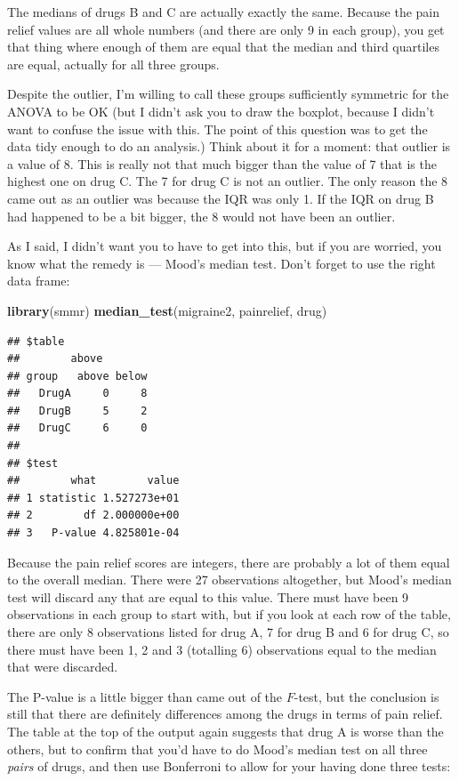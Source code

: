 \documentclass[]{tufte-book}
\newenvironment{Shaded}{}{}
\newcommand{\KeywordTok}[1]{\textcolor[rgb]{0.00,0.44,0.13}{\textbf{#1}}}
\newcommand{\NormalTok}[1]{#1}
\theoremstyle{definition}
\theoremstyle{definition}
\theoremstyle{definition}
\theoremstyle{remark}
\begin{document}
The medians of drugs B and C are actually exactly the same. Because the
pain relief values are all whole numbers (and there are only 9 in each
group), you get that thing where enough of them are equal that the
median and third quartiles are equal, actually for all three groups.

Despite the outlier, I'm willing to call these groups sufficiently
symmetric for the ANOVA to be OK (but I didn't ask you to draw the
boxplot, because I didn't want to confuse the issue with this. The point
of this question was to get the data tidy enough to do an analysis.)
Think about it for a moment: that outlier is a value of 8. This is
really not that much bigger than the value of 7 that is the highest one
on drug C. The 7 for drug C is not an outlier. The only reason the 8
came out as an outlier was because the IQR was only 1. If the IQR on
drug B had happened to be a bit bigger, the 8 would not have been an
outlier.

As I said, I didn't want you to have to get into this, but if you are
worried, you know what the remedy is --- Mood's median test. Don't
forget to use the right data frame:

\begin{Shaded}
\begin{Highlighting}[]
\KeywordTok{library}\NormalTok{(smmr)}
\KeywordTok{median_test}\NormalTok{(migraine2, painrelief, drug)}
\end{Highlighting}
\end{Shaded}

\begin{verbatim}
## $table
##        above
## group   above below
##   DrugA     0     8
##   DrugB     5     2
##   DrugC     6     0
## 
## $test
##        what        value
## 1 statistic 1.527273e+01
## 2        df 2.000000e+00
## 3   P-value 4.825801e-04
\end{verbatim}

Because the pain relief scores are integers, there are probably a lot of
them equal to the overall median. There were 27 observations altogether,
but Mood's median test will discard any that are equal to this value.
There must have been 9 observations in each group to start with, but if
you look at each row of the table, there are only 8 observations listed
for drug A, 7 for drug B and 6 for drug C, so there must have been 1, 2
and 3 (totalling 6) observations equal to the median that were
discarded.

The P-value is a little bigger than came out of the \(F\)-test, but the
conclusion is still that there are definitely differences among the
drugs in terms of pain relief. The table at the top of the output again
suggests that drug A is worse than the others, but to confirm that you'd
have to do Mood's median test on all three \emph{pairs} of drugs, and
then use Bonferroni to allow for your having done three tests:
\end{document}
